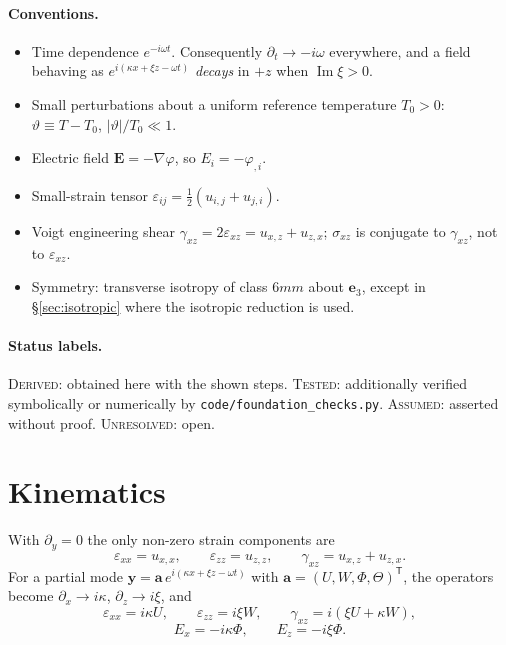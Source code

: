 \documentclass[11pt]{article}
\newcommand{\s}{\sigma}
\newcommand{\eps}{\varepsilon}
\newcommand{\bth}{\vartheta}
\newcommand{\E}{\bm{E}}
\theoremstyle{plain}
\begin{document}
\paragraph{Conventions.}
\begin{itemize}
  \item Time dependence $e^{-i\omega t}$. Consequently $\partial_t \to -i\omega$
        everywhere, and a field behaving as $e^{i(\kappa x+\xi z-\omega t)}$
        \emph{decays} in $+z$ when $\operatorname{Im}\xi>0$.
  \item Small perturbations about a uniform reference temperature $T_0>0$:
        $\bth \equiv T - T_0$, $|\bth|/T_0 \ll 1$.
  \item Electric field $\E = -\nabla\varphi$, so $E_i = -\varphi_{,i}$.
  \item Small-strain tensor $\eps_{ij} = \tfrac12(u_{i,j}+u_{j,i})$.
  \item Voigt engineering shear $\gamma_{xz} = 2\eps_{xz} = u_{x,z}+u_{z,x}$;
        $\s_{xz}$ is conjugate to $\gamma_{xz}$, not to $\eps_{xz}$.
  \item Symmetry: transverse isotropy of class $6mm$ about $\bm{e}_3$, except in
        \S\ref{sec:isotropic} where the isotropic reduction is used.
\end{itemize}

\paragraph{Status labels.} \textsc{Derived}: obtained here with the shown steps.
\textsc{Tested}: additionally verified symbolically or numerically by
\texttt{code/foundation\_checks.py}. \textsc{Assumed}: asserted without proof.
\textsc{Unresolved}: open.

\section{Kinematics}
\label{sec:kinematics}

With $\partial_y = 0$ the only non-zero strain components are
\begin{equation}
  \eps_{xx} = u_{x,x}, \qquad
  \eps_{zz} = u_{z,z}, \qquad
  \gamma_{xz} = u_{x,z} + u_{z,x}.
  \label{eq:strain}
\end{equation}
For a partial mode $\bm{y} = \bm{a}\,e^{i(\kappa x + \xi z - \omega t)}$ with
$\bm{a}=(U,W,\Phi,\Theta)^{\mathsf T}$, the operators become
$\partial_x \to i\kappa$, $\partial_z \to i\xi$, and
\begin{equation}
  \eps_{xx} = i\kappa U, \qquad
  \eps_{zz} = i\xi W, \qquad
  \gamma_{xz} = i(\xi U + \kappa W),
  \label{eq:strain-mode}
\end{equation}
\begin{equation}
  E_x = -i\kappa\Phi, \qquad E_z = -i\xi\Phi.
  \label{eq:E-mode}
\end{equation}
\end{document}

